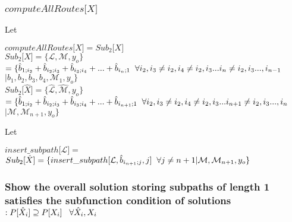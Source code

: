 \documentclass[11pt]{article}
\begin{document}
\subsubsection{$computeAllRoutes\lbrack X\rbrack$}
Let
\begin{center}
$
computeAllRoutes\lbrack X\rbrack = Sub_2\lbrack X \rbrack
$
\\ \vspace{2mm}
$
Sub_2 \lbrack X \rbrack = \{ \mathcal{L},\mathcal{M},y_o\}
$
\\ \vspace{2mm}
$
= \{\hat{b}_{1;i_2}+\hat{b}_{i_2;i_3}+\hat{b}_{i_3;i_4}+...+\hat{b}_{i_{n};1} \hspace{2mm} \forall i_2,i_3 \neq i_2, i_4 \neq i_2,i_3 ... i_n \neq i_2,i_3...,i_{n-1} \hspace{2mm}
$
\\ \vspace{1mm}
$
| b_1,b_2,b_3,b_4,\mathcal{M}_1,y_o \}
$
\\ \vspace{6mm}
$
Sub_2 \lbrack\hat{X} \rbrack = \{ \hat{\mathcal{L}},\hat{\mathcal{M}},y_o\}
$
\\ \vspace{2mm}
$
= \{\hat{b}_{1;i_2}+\hat{b}_{i_2;i_3}+\hat{b}_{i_3;i_4}+...+\hat{b}_{i_{n+1};1} \hspace{2mm} \forall i_2,i_3 \neq i_2, i_4 \neq i_2,i_3 ... i_{n+1} \neq i_2,i_3...,i_{n} \hspace{2mm}
$
\\ \vspace{1mm}
$
| \mathcal{M},\mathcal{M}_{n+1},y_o \}
$
\end{center}
\vspace{6mm}Let
\begin{center}
$
insert\_subpath\lbrack \mathcal{L} \rbrack =
$
\\ \vspace{8mm}
$
Sub_2 \lbrack\hat{X} \rbrack =  \{ insert\_subpath\lbrack \mathcal{L},\hat{b}_{i_{n+1};j},j \rbrack \hspace{2mm} \forall j \neq n+1 | \mathcal{M},\mathcal{M}_{n+1},y_o \}
$
\end{center}




\subsubsection{Show the overall solution storing subpaths of length 1 satisfies the subfunction condition of solutions $: P[\hat{X}_i] \supseteq P[X_i] \hspace{3mm} \forall \hat{X}_i,X_i$}
\end{document}
